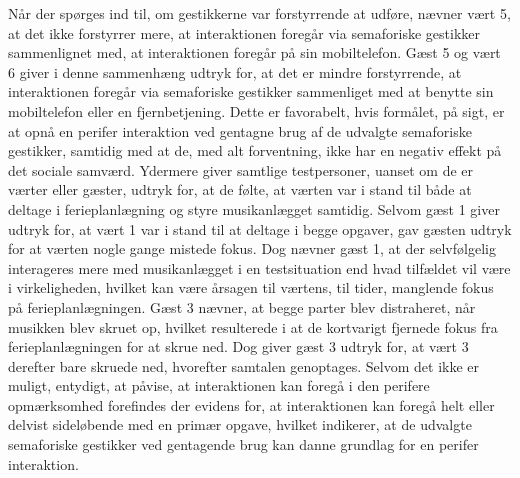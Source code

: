 Når der spørges ind til, om gestikkerne var forstyrrende at udføre, nævner vært 5, at det ikke forstyrrer mere, at interaktionen foregår via semaforiske gestikker sammenlignet med, at interaktionen foregår på sin mobiltelefon. Gæst 5 og vært 6 giver i denne sammenhæng udtryk for, at det er mindre forstyrrende, at interaktionen foregår via semaforiske gestikker sammenliget med at benytte sin mobiltelefon eller en fjernbetjening. Dette er favorabelt, hvis formålet, på sigt, er at opnå en perifer interaktion ved gentagne brug af de udvalgte semaforiske gestikker, samtidig med at de, med alt forventning, ikke har en negativ effekt på det sociale samværd. \blankline
%
Ydermere giver samtlige testpersoner, uanset om de er værter eller gæster, udtryk for, at de følte, at værten var i stand til både at deltage i ferieplanlægning og styre musikanlægget samtidig. Selvom gæst 1 giver udtryk for, at vært 1 var i stand til at deltage i begge opgaver, gav gæsten udtryk for at værten nogle gange mistede fokus. Dog nævner gæst 1, at der selvfølgelig interageres mere med musikanlægget i en testsituation end hvad tilfældet vil være i virkeligheden, hvilket kan være årsagen til værtens, til tider, manglende fokus på ferieplanlægningen. Gæst 3 nævner, at begge parter blev distraheret, når musikken blev skruet op, hvilket resulterede i at de kortvarigt fjernede fokus fra ferieplanlægningen for at skrue ned. Dog giver gæst 3 udtryk for, at vært 3 derefter bare skruede ned, hvorefter samtalen genoptages. \blankline
%
Selvom det ikke er muligt, entydigt, at påvise, at interaktionen kan foregå i den perifere opmærksomhed forefindes der evidens for, at interaktionen kan foregå helt eller delvist sideløbende med en primær opgave, hvilket indikerer, at de udvalgte semaforiske gestikker ved gentagende brug kan danne grundlag for en perifer interaktion.


